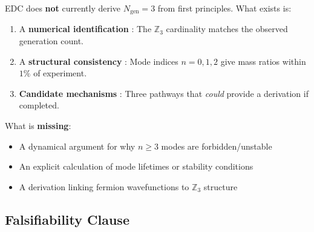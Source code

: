 \begin{tcolorbox}[colback=gray!5, colframe=gray!50!black,
    title=\textbf{Current Status: [I]/[P] — Not Derived}]
EDC does \textbf{not} currently derive $N_{\text{gen}} = 3$ from first principles.
What exists is:
\begin{enumerate}[nosep]
    \item A \textbf{numerical identification} \tagI{}: The $\mathbb{Z}_3$ cardinality
          matches the observed generation count.
    \item A \textbf{structural consistency} \tagI{}: Mode indices $n = 0, 1, 2$ give
          mass ratios within $1\%$ of experiment.
    \item \textbf{Candidate mechanisms} \tagP{}: Three pathways that \emph{could}
          provide a derivation if completed.
\end{enumerate}

What is \textbf{missing}:
\begin{itemize}[nosep]
    \item A dynamical argument for why $n \geq 3$ modes are forbidden/unstable
    \item An explicit calculation of mode lifetimes or stability conditions
    \item A derivation linking fermion wavefunctions to $\mathbb{Z}_3$ structure
\end{itemize}
\end{tcolorbox}

\subsection{Falsifiability Clause}
\label{sec:ch5_falsifiability}

